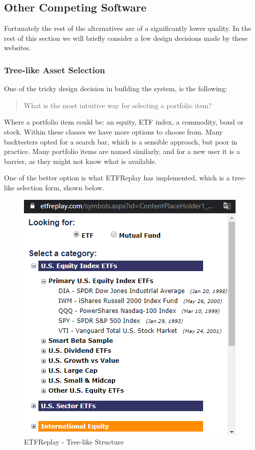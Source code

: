 \documentclass[main.tex]{subfiles}
\begin{document}
\subsection{Other Competing Software}

Fortunately the rest of the alternatives are of a significantly lower quality. In the rest of this section we will briefly consider a few design decisions made by these websites.

\subsubsection*{Tree-like Asset Selection}

One of the tricky design decision in building the system, is the following: 

\begin{quote}
    What is the most intuitive way for selecting a portfolio item? 
\end{quote}

Where a portfolio item could be: an equity, ETF index, a commodity, bond or stock. Within these classes we have more options to choose from. Many backtesters opted for a search bar, which is a sensible approach, but poor in practice. Many portfolio items are named similarly, and for a new user it is a barrier, as they might not know what is available. 

One of the better option is what ETFReplay \cite{etfreplay} has implemented, which is a tree-like selection form, shown below. 

\begin{figure}[H]
   \centering
   \includegraphics[scale=0.7]{02Background/02Pictures/etfreplay.png}
   \caption{ETFReplay - Tree-like Structure}
\end{figure}
\end{document}
